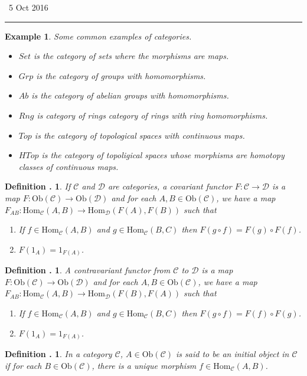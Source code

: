 \documentclass[twoside]{report}
\newcommand{\Ob}{\textrm{Ob}}
\newcommand{\Hom}{\textrm{Hom}}
\newcommand{\fanC}{\mathscr{C}}
\newcommand{\fanD}{\mathscr{D}}
\newcounter{Lecture}
\newcommand{\newLec}[1]{
  \stepcounter{Lecture}
  \noindent{\Large\bf Lecture \arabic{Lecture}} \, #1 \hfill  \rule[1ex]{2.5in}{.1pt} \vspace{1em}
}
\theoremstyle{myts}
\newcounter{c}[Lecture]
\newtheorem{dfn}[c]{Definition \arabic{Lecture}.}
\newtheorem*{epl}{Example}
\newcounter{ex}[Lecture]
\begin{document}
\newLec{5 Oct 2016}

\begin{epl} Some common examples of categories.
  \begin{itemize}
    \item \(Set\) is the category of sets where the morphisms are maps.
    \item \(Grp\) is the category of groups with homomorphisms.
    \item \(Ab\) is the category of abelian groups with homomorphisms.
    \item \(Rng\) is category of rings category of rings with ring homomorphisms.
    \item \(Top\) is the category of topological spaces with continuous maps.
    \item \(HTop\) is the category of topoligical spaces whose morphisms are homotopy classes of continuous maps.
  \end{itemize}
\end{epl}

\begin{dfn}
  If $\fanC$ and $\fanD$ are categories, a \emph{covariant functor} \( F : \fanC \to \fanD \) is a map \( F : \Ob(\fanC) \to \Ob (\fanD) \) and for each \( A, B \in \Ob(\fanC) \), we have a map \( F_{AB} : \Hom_\fanC(A,B) \to \Hom_\fanD(F(A), F(B) ) \) such that
  \begin{enumerate}[(1)]
    \item If \( f\in \Hom_\fanC(A,B) \) and \( g\in \Hom_\fanC (B,C) \) then \( F(g\circ f) = F(g) \circ F(f) \).
    \item \( F(1_A) = 1_{F(A)} \).
  \end{enumerate}
\end{dfn}

\begin{dfn}
  A \emph{contravariant functor} from $\fanC$ to $\fanD$ is a map \( F: \Ob(\fanC) \to \Ob(\fanD) \) and for each \( A, B \in \Ob(\fanC) \), we have a map \( F_{AB} : \Hom_\fanC(A,B) \to \Hom_\fanD(F(B), F(A) ) \) such that
  \begin{enumerate}[(1)]
    \item If \( f\in \Hom_\fanC(A,B) \) and \( g\in \Hom_\fanC (B,C) \) then \( F(g\circ f) = F(f) \circ F(g) \).
    \item \( F(1_A) = 1_{F(A)} \).
  \end{enumerate}
\end{dfn}

\begin{dfn}
  In a category $\fanC$, \( A\in \Ob(\fanC) \) is said to be an \emph{initial object} in $\fanC$ if for each \( B\in \Ob(\fanC) \), there is a unique morphism \( f \in \Hom_\fanC (A,B) \).
\end{dfn}
\end{document}
